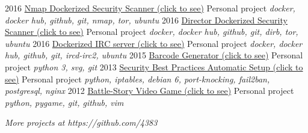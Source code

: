 \documentclass[]{friggeri-cv}
\begin{document}
\begin{entrylist}
    \entry
        {2016}
        {\href{https://hub.docker.com/r/4383/system-service-footprint}{Nmap Dockerized Security Scanner (click to see)}}
        {Personal project}
        {\emph{docker, docker hub, github, git, nmap, tor, ubuntu}}
    \entry
        {2016}
        {\href{https://hub.docker.com/r/4383/director}{Director Dockerized Security Scanner (click to see)}}
        {Personal project}
        {\emph{docker, docker hub, github, git, dirb, tor, ubuntu}}
    \entry
        {2016}
        {\href{https://hub.docker.com/r/4383/irc-server}{Dockerized IRC server (click to see)}}
        {Personal project}
        {\emph{docker, docker hub, github, git, ircd-irc2, ubuntu}}
    \entry
        {2015}
        {\href{http://pypi.python.org/pypi/barcode-generator/0.1rc15}{Barcode Generator (click to see)}}
        {Personal project}
        {\emph{python 3, svg, git}}
    \entry
        {2013}
        {\href{https://github.com/4383/fabric-debian/}{Security Best Practices Automatic Setup (click to see)}}
        {Personal project}
        {\emph{python, iptables,  debian 6, port-knocking, fail2ban, postgresql, nginx}}
    \entry
        {2012}
        {\href{http://github.com/4383/battle-story/}{Battle-Story Video Game (click to see)}}
        {Personal project}
        {\emph{python, pygame, git, github, vim}}
\end{entrylist}

\begin{flushright}
    \emph{More projects at https://github.com/4383}
\end{flushright}
\end{document}
